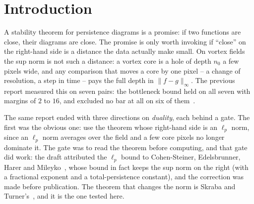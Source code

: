 \documentclass[11pt,a4paper]{article}
\begin{document}
\begin{abstract}
a resolution or time comparison changes every cell; the ratio of the two bounds scales as (cells per
bar)$^{1/p}$, which is why $V_2\approx\sqrt{V_1}$ on all seven pairs and why no $p$ helps -- small
$p$ pays the cell count, large $p$ returns to the vortex cores. The theorem is sharp exactly where the
control shows it: a perturbation that touches nine cells per critical value it moves. A second
finding was not looked for: the previous report's phase-space certificate had been computed on five
points per side, the same class of defect as the corruption it reported; it is corrected here. Two further directions are taken
to their gates and stopped there, with the reasons written down: the Berezinskii--Kosterlitz--Thouless
transition, which these fields carry but which needs a finite-temperature run this project does not
have; and the Fricke involution of an external review, which we now compare with Dolgachev's theorem
on the mirror moduli space of K3 surfaces read in full, and find to be the same involution without the
group -- a shadow, not an instance; the group theory behind that verdict (the Fricke matrix normalizes
$\Gamma_0(n)$; its axis action is this project's involution) is proved in Lean~4, as group theory.
\end{abstract}

\section{Introduction}

A stability theorem for persistence diagrams is a promise: if two functions are close, their diagrams
are close. The promise is only worth invoking if ``close'' on the right-hand side is a distance the data
actually make small. On vortex fields the sup norm is not such a distance: a vortex core is a hole of
depth $n_0$ a few pixels wide, and any comparison that moves a core by one pixel -- a change of
resolution, a step in time -- pays the full depth in $\|f-g\|_\infty$. The previous report measured this
on seven pairs: the bottleneck bound held on all seven with margins of $2$ to $16$, and excluded no bar
at all on six of them~\cite{Callens2026Loop}.

The same report ended with three directions on \emph{duality}, each behind a gate. The first was the
obvious one: use the theorem whose right-hand side is an $\ell_p$ norm, since an $\ell_p$ norm
averages over the field and a few core pixels no longer dominate it. The gate was to read the theorem
before computing, and that gate did work: the draft attributed the $\ell_p$ bound to Cohen-Steiner,
Edelsbrunner, Harer and Mileyko~\cite{CSEHM2010}, whose bound in fact keeps the sup norm on the right
(with a fractional exponent and a total-persistence constant), and the correction was made before
publication. The theorem that changes the norm is Skraba and Turner's~\cite{SkrabaTurner2020}, and it
is the one tested here.
\end{document}

